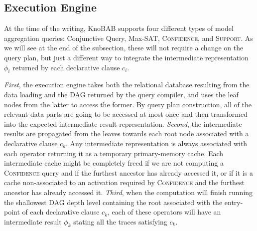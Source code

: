 
\subsection{Execution Engine} \label{ssec:xltlf}
At the time of the writing, KnoBAB supports four different types of model aggregation queries: Conjunctive Query, Max-SAT, \textsc{Confidence}, and \textsc{Support}. As we will see at the end of the subsection, these will not require a change on the query plan, but just a different way to integrate the intermediate representation $\phi_i$ returned by each declarative clause $c_i$. 


\textit{First}, the execution engine takes both the relational database resulting from the data loading and the DAG returned by the query compiler, and uses the leaf nodes from the latter to access the former. By query plan construction, all of the relevant data parts are going to be accessed at most once and then transformed into the expected intermediate result representation. \textit{Second}, the intermediate results are propagated from the leaves towards each root node associated with a declarative clause $c_k$. Any intermediate representation is always associated with each operator returning it as a temporary primary-memory cache. Each intermediate cache  might be completely freed if we are not computing a  \textsc{Confidence} query and if the furthest ancestor has already accessed it, or if it is a cache non-associated to an activation required by \textsc{Confidence} and the furthest ancestor has already accessed it. \textit{Third}, when the computation will finish running the shallowest DAG depth level containing the \xLTLf root associated with the entry-point of each declarative clause $c_k$, each of these operators will have an intermediate result $\phi_k$ stating all the traces satisfying $c_k$.

